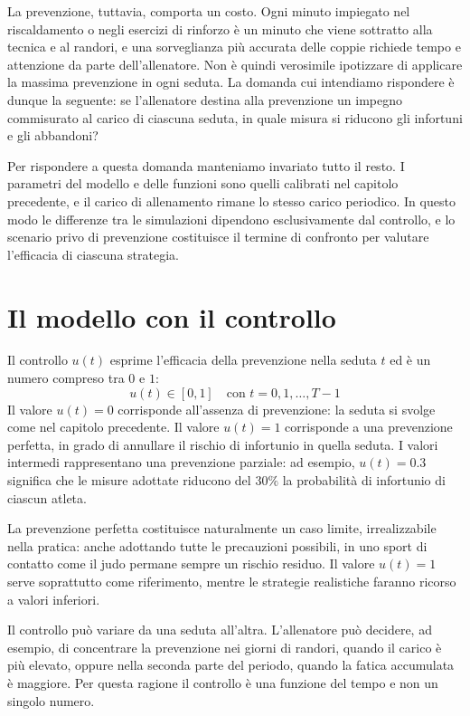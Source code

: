 La prevenzione, tuttavia, comporta un costo. Ogni minuto impiegato nel riscaldamento o negli esercizi di rinforzo è un minuto che viene sottratto alla tecnica e al randori, e una sorveglianza più accurata delle coppie richiede tempo e attenzione da parte dell'allenatore. Non è quindi verosimile ipotizzare di applicare la massima prevenzione in ogni seduta. La domanda cui intendiamo rispondere è dunque la seguente: se l'allenatore destina alla prevenzione un impegno commisurato al carico di ciascuna seduta, in quale misura si riducono gli infortuni e gli abbandoni? \par

Per rispondere a questa domanda manteniamo invariato tutto il resto. I parametri del modello e delle funzioni sono quelli calibrati nel capitolo precedente, e il carico di allenamento rimane lo stesso carico periodico. In questo modo le differenze tra le simulazioni dipendono esclusivamente dal controllo, e lo scenario privo di prevenzione costituisce il termine di confronto per valutare l'efficacia di ciascuna strategia.

\section{Il modello con il controllo}

Il controllo $u(t)$ esprime l'efficacia della prevenzione nella seduta $t$ ed è un numero compreso tra $0$ e $1$:
\[
    u(t) \in [0, 1] \quad \text{con } t = 0, 1, \dots, T - 1
\]
Il valore $u(t) = 0$ corrisponde all'assenza di prevenzione: la seduta si svolge come nel capitolo precedente. Il valore $u(t) = 1$ corrisponde a una prevenzione perfetta, in grado di annullare il rischio di infortunio in quella seduta. I valori intermedi rappresentano una prevenzione parziale: ad esempio, $u(t) = 0.3$ significa che le misure adottate riducono del $30\%$ la probabilità di infortunio di ciascun atleta. \par

La prevenzione perfetta costituisce naturalmente un caso limite, irrealizzabile nella pratica: anche adottando tutte le precauzioni possibili, in uno sport di contatto come il judo permane sempre un rischio residuo. Il valore $u(t) = 1$ serve soprattutto come riferimento, mentre le strategie realistiche faranno ricorso a valori inferiori. \par

Il controllo può variare da una seduta all'altra. L'allenatore può decidere, ad esempio, di concentrare la prevenzione nei giorni di randori, quando il carico è più elevato, oppure nella seconda parte del periodo, quando la fatica accumulata è maggiore. Per questa ragione il controllo è una funzione del tempo e non un singolo numero.

